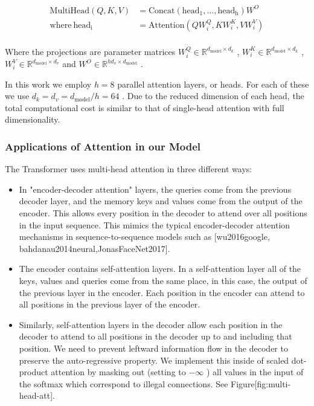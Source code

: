 \documentclass[11pt,a4paper]{article}
\begin{document}
$$\begin{align*}
    \mathrm{MultiHead}(Q, K, V) &= \mathrm{Concat}(\mathrm{head_1}, ..., \mathrm{head_h})W^O\\
    \text{where}~\mathrm{head_i} &= \mathrm{Attention}(QW^Q_i, KW^K_i, VW^V_i)\\
\end{align*}$$

Where the projections are parameter matrices  $W^Q_i \in \mathbb{R}^{d_{\text{model}} \times d_k}$ ,  $W^K_i \in \mathbb{R}^{d_{\text{model}} \times d_k}$ ,  $W^V_i \in \mathbb{R}^{d_{\text{model}} \times d_v}$  and  $W^O \in \mathbb{R}^{hd_v \times d_{\text{model}}}$ .

In this work we employ  $h=8$  parallel attention layers, or heads. For each of these we use  $d_k=d_v=d_{\text{model}}/h=64$ . Due to the reduced dimension of each head, the total computational cost is similar to that of single-head attention with full dimensionality.

\subsubsection{Applications of Attention in our Model}

The Transformer uses multi-head attention in three different ways:

\begin{itemize}
\item In "encoder-decoder attention" layers, the queries come from the previous decoder layer, and the memory keys and values come from the output of the encoder.   This allows every position in the decoder to attend over all positions in the input sequence.  This mimics the typical encoder-decoder attention mechanisms in sequence-to-sequence models such as [wu2016google, bahdanau2014neural,JonasFaceNet2017].
\item The encoder contains self-attention layers.  In a self-attention layer all of the keys, values and queries come from the same place, in this case, the output of the previous layer in the encoder.   Each position in the encoder can attend to all positions in the previous layer of the encoder.
\item Similarly, self-attention layers in the decoder allow each position in the decoder to attend to all positions in the decoder up to and including that position.  We need to prevent leftward information flow in the decoder to preserve the auto-regressive property.  We implement this inside of scaled dot-product attention by masking out (setting to  $-\infty$ ) all values in the input of the softmax which correspond to illegal connections.  See Figure[fig:multi-head-att].
\end{itemize}
\end{document}
